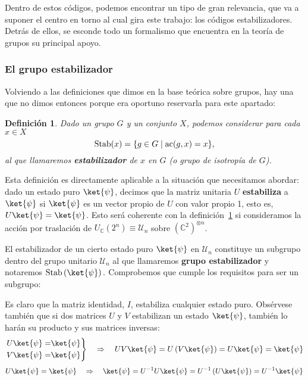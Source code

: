 \documentclass[11pt,a4paper,twoside,pdf]{article}
\numberwithin{equation}{section}
\newtheorem{definition}{Definición}
\begin{document}
	Dentro de estos códigos, podemos encontrar un tipo de gran relevancia, que va a suponer el centro en torno al cual gira este trabajo: los códigos estabilizadores. Detrás de ellos, se esconde todo un formalismo que encuentra en la teoría de grupos su principal apoyo.
	
		\subsubsection{El grupo estabilizador}
		
		Volviendo a las definiciones que dimos en la base teórica sobre grupos, hay una que no dimos entonces porque era oportuno reservarla para este apartado:
		
			\begin{definition} \label{def: estabilizador}
				Dado un grupo $G$ y un conjunto $X$, podemos considerar para cada $x \in X$
					\[ \textup{Stab}(x)=\{g \in G \; | \; \text{ac}(g,x)=x\}, \]
				al que llamaremos \textbf{estabilizador} de $x$ en $G$ (o grupo de isotropía de $G$).
			\end{definition}
		
		Esta definición es directamente aplicable a la situación que necesitamos abordar: dado un estado puro $\ket{\psi}$, decimos que la matriz unitaria $U$ \textbf{estabiliza} a $\ket{\psi}$ si $\ket{\psi}$ es un vector propio de $U$ con valor propio 1, esto es, $U\ket{\psi}=\ket{\psi}$. 
		Esto será coherente con la definición \ref{def: estabilizador} si consideramos la acción por traslación de $U_\mathbb{C}(2^n)\equiv \mathcal{U}_n$ sobre $\left( \mathbb{C}^2\right)^{\otimes n}$.
		
		El estabilizador de un cierto estado puro $\ket{\psi}$ en $\mathcal{U}_n$ constituye un subgrupo dentro del grupo unitario $\mathcal{U}_n$ al que llamaremos \textbf{grupo estabilizador} y notaremos $\text{Stab}\left(\ket{\psi}\right).$ Comprobemos que cumple los requisitos para ser un subgrupo:
		
		Es claro que la matriz identidad, $I$, estabiliza cualquier estado puro. Obsérvese también que si dos matrices $U$ y $V$ estabilizan un estado $\ket{\psi}$, también lo harán su producto y sus matrices inversas:
			\begin{equation*}
				\left.\begin{aligned} U\ket{\psi} =& \ket{\psi}  \\ V\ket{\psi}=&\ket{\psi} \end{aligned}\right\} \quad \Rightarrow \quad UV\ket{\psi}=U\left( V\ket{\psi} \right)=U \ket{\psi}= \ket{\psi}	
			\end{equation*}
			\begin{equation*}
				U\ket{\psi} = \ket{\psi} \quad \Rightarrow \quad \ket{\psi} = U^{-1}U\ket{\psi} = U^{-1} \left( U \ket{\psi} \right) = U^{-1} \ket{\psi}
			\end{equation*}
	
\end{document}
